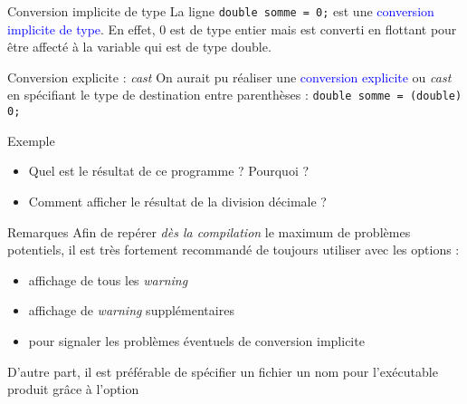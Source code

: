 \documentclass[10pt]{beamer}
\begin{document}
\begin{frame}[fragile]{\Ctitle}{\stitle}
	\begin{block}{Conversion implicite de type}
		La ligne \texttt{double somme = 0;} est une \textcolor{blue}{conversion implicite de type}. En effet, 0 est de type entier mais est converti en flottant pour être affecté à la variable  qui est de type double.
	\end{block}
	\begin{block}{Conversion explicite : \textit{cast}}
		On aurait pu réaliser une \textcolor{blue}{conversion explicite} ou \textit{cast} en spécifiant le type de destination entre parenthèses : \texttt{double somme = (double) 0;}
	\end{block}
\end{frame}

\begin{frame}[fragile]{\Ctitle}{\stitle}
	\begin{exampleblock}{Exemple}
	\begin{itemize}
	\item<2-> Quel est le résultat de ce programme ? Pourquoi ?
	\item<3-> Comment afficher le résultat de la division décimale ?
	\end{itemize}
	\end{exampleblock}
\end{frame}

\begin{frame}{\Ctitle}{\stitle}
	\begin{block}{Remarques}
		Afin de repérer \textit{dès la compilation} le maximum de problèmes potentiels, il est \textcolor{BrickRed}{très fortement recommandé} de toujours utiliser  avec les options :
		\begin{itemize}
			\item<2-> affichage de tous les \textit{warning}
			\item<3-> affichage de \textit{warning} supplémentaires
			\item<4-> pour signaler les problèmes éventuels de conversion implicite
		\end{itemize}
		 D'autre part, il est préférable de spécifier un fichier un nom pour l'exécutable produit grâce à l'option 
	\end{block}
\end{frame}
\end{document}
